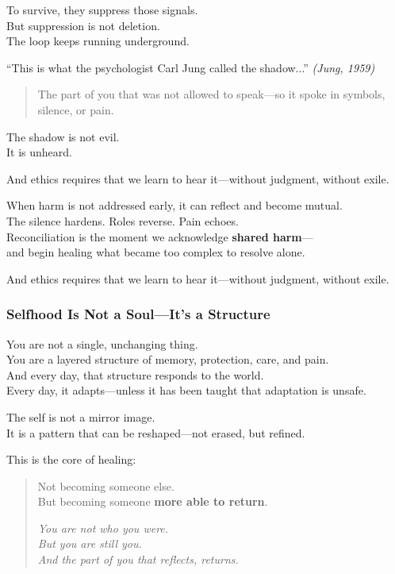 To survive, they suppress those signals.\\
But suppression is not deletion.\\
The loop keeps running underground.

``This is what the psychologist Carl Jung called the shadow...''
\emph{(Jung, 1959)}

\begin{quote}
The part of you that was not allowed to speak---so it spoke in symbols,
silence, or pain.
\end{quote}

The shadow is not evil.\\
It is unheard.

And ethics requires that we learn to hear it---without judgment, without
exile.

When harm is not addressed early, it can reflect and become mutual.\\
The silence hardens. Roles reverse. Pain echoes.\\
Reconciliation is the moment we acknowledge \textbf{shared harm}---\\
and begin healing what became too complex to resolve alone.

And ethics requires that we learn to hear it---without judgment, without
exile.

\subsubsection{\texorpdfstring{\textbf{Selfhood Is Not a Soul---It's a
Structure}}{Selfhood Is Not a Soul---It's a Structure}}\label{selfhood-is-not-a-soulits-a-structure}

You are not a single, unchanging thing.\\
You are a layered structure of memory, protection, care, and pain.\\
And every day, that structure responds to the world.\\
Every day, it adapts---unless it has been taught that adaptation is
unsafe.

The self is not a mirror image.\\
It is a pattern that can be reshaped---not erased, but refined.

This is the core of healing:

\begin{quote}
Not becoming someone else.\\
But becoming someone \textbf{more able to return}.

\emph{You are not who you were.\\
But you are still you.\\
And the part of you that reflects, returns.}
\end{quote}

